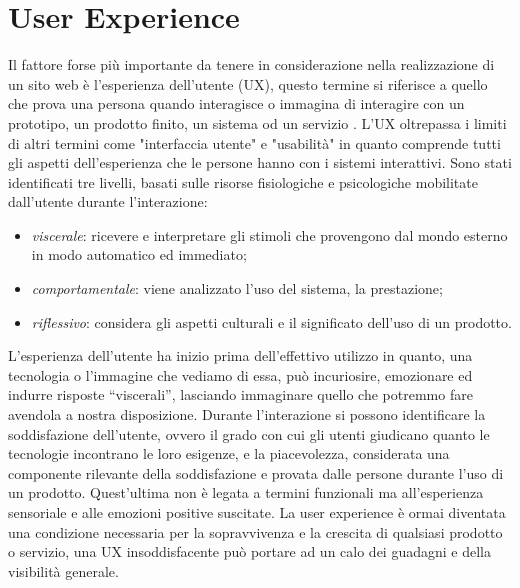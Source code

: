 \documentclass[target=bach,aauheader=]{thud}
\begin{document}
\section{User Experience}
Il fattore forse più importante da tenere in considerazione nella realizzazione di un sito web è l'esperienza dell'utente (UX), questo termine si riferisce a quello che prova una persona quando interagisce o immagina di interagire con un prototipo, un prodotto finito, un sistema od un servizio \cite{hassenzahl2006user}.
L'UX oltrepassa i limiti di altri termini come "interfaccia utente" e "usabilità" in quanto comprende tutti gli aspetti dell'esperienza che le persone hanno con i sistemi interattivi.
\newline 
Sono stati identificati tre livelli, basati sulle risorse fisiologiche e psicologiche mobilitate dall'utente durante l'interazione:
\begin{itemize}
    \item \textit{viscerale}: ricevere e interpretare gli stimoli che provengono dal mondo esterno in modo automatico ed immediato;
    \item \textit{comportamentale}: viene analizzato l'uso del sistema, la prestazione;
    \item \textit{riflessivo}: considera gli aspetti culturali e il significato dell'uso di un prodotto.
\end{itemize}
L'esperienza dell'utente ha inizio prima dell'effettivo utilizzo in quanto, una tecnologia o l'immagine che vediamo di essa, può incuriosire, emozionare ed indurre risposte “viscerali”, lasciando immaginare quello che potremmo fare avendola a nostra disposizione.
Durante l'interazione si possono identificare la soddisfazione dell'utente, ovvero il grado con cui gli utenti giudicano quanto le tecnologie incontrano le loro esigenze, e la piacevolezza, considerata una componente rilevante della soddisfazione e provata dalle persone durante l'uso di un prodotto.
Quest'ultima non è legata a termini funzionali ma all'esperienza sensoriale e alle emozioni positive suscitate. 
\newline
La user experience è ormai diventata una condizione necessaria per la sopravvivenza e la crescita di qualsiasi prodotto o servizio, una UX insoddisfacente può portare ad un calo dei guadagni e della visibilità generale.

\end{document}
